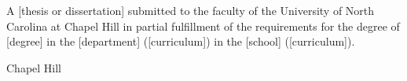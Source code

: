 \begin{titlepage}
\begin{center} %

\vspace{2in}
\begin{singlespace}
\MakeUppercase{\docTitle}
\end{singlespace}

\vspace{1in} %
\large \docAuthorFull
\end{center}

%
%
\vspace{40pt}
\begin{singlespace}
\noindent
A [thesis or dissertation] submitted to the faculty of the University of North Carolina at Chapel Hill in partial fulfillment of the requirements for the degree of [degree] in the [department] ([curriculum]) in the [school] ([curriculum]).
\end{singlespace}

\vspace{1in}
\begin{center}
\begin{singlespace}
Chapel Hill\\
\the\year{} %
\end{singlespace}
\end{center}


\end{titlepage}
